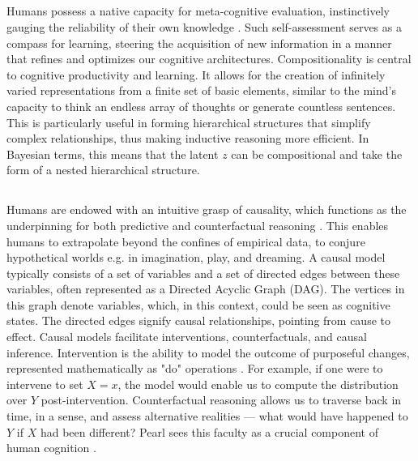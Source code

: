 \subsection{}
Humans possess a native capacity for meta-cognitive evaluation, instinctively gauging the reliability of their own knowledge \cite{Lake_Ullman_Tenenbaum_Gershman_2017}. Such self-assessment serves as a compass for learning, steering the acquisition of new information in a manner that refines and optimizes our cognitive architectures.
Compositionality is central to cognitive productivity and learning. It allows for the creation of infinitely varied representations from a finite set of basic elements, similar to the mind's capacity to think an endless array of thoughts or generate countless sentences. This is particularly useful in forming hierarchical structures that simplify complex relationships, thus making inductive reasoning more efficient.
In Bayesian terms, this means that the latent $z$ can be compositional and take the form of a nested hierarchical structure.



\subsection{}
Humans are endowed with an intuitive grasp of causality, which functions as the underpinning for both predictive and counterfactual reasoning \cite{Lake_Ullman_Tenenbaum_Gershman_2017}. This enables humans to extrapolate beyond the confines of empirical data, to conjure hypothetical worlds e.g. in imagination, play, and dreaming.
A causal model typically consists of a set of variables and a set of directed edges between these variables, often represented as a Directed Acyclic Graph (DAG). The vertices in this graph denote variables, which, in this context, could be seen as cognitive states. The directed edges signify causal relationships, pointing from cause to effect.
Causal models facilitate interventions, counterfactuals, and causal inference. Intervention is the ability to model the outcome of purposeful changes, represented mathematically as "do" operations  \cite{Pearl_2018}. For example, if one were to intervene to set $X = x$, the model would enable us to compute the distribution over $Y$ post-intervention.
Counterfactual reasoning allows us to traverse back in time, in a sense, and assess alternative realities — what would have happened to $Y$ if $X$ had been different?
Pearl sees this faculty as a crucial component of human cognition \cite{Pearl_2018}.



